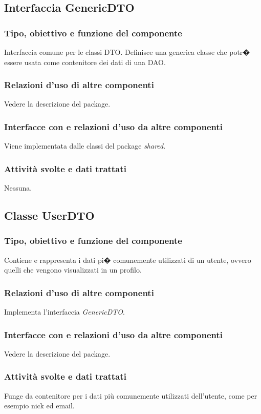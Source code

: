 \subsection{Interfaccia GenericDTO}
\subsubsection*{Tipo, obiettivo e funzione del componente}
Interfaccia comune per le classi DTO. Definisce una generica classe che potr�
essere usata come contenitore dei dati di una DAO.
\subsubsection*{Relazioni d'uso di altre componenti}
Vedere la descrizione del package.
\subsubsection*{Interfacce con e relazioni d'uso da altre componenti}
Viene implementata dalle classi del package \textit{shared}.
\subsubsection*{Attivit\`a svolte e dati trattati}
Nessuna. 

\subsection{Classe UserDTO}
\subsubsection*{Tipo, obiettivo e funzione del componente}
Contiene e rappresenta i dati pi� comunemente utilizzati di un utente, ovvero
quelli che vengono visualizzati in un profilo.
\subsubsection*{Relazioni d'uso di altre componenti}
Implementa l'interfaccia \textit{GenericDTO}.
\subsubsection*{Interfacce con e relazioni d'uso da altre componenti}
Vedere la descrizione del package.
\subsubsection*{Attivit\`a svolte e dati trattati}
Funge da contenitore per i dati pi\`u comunemente utilizzati dell'utente, come
per esempio nick ed email.

